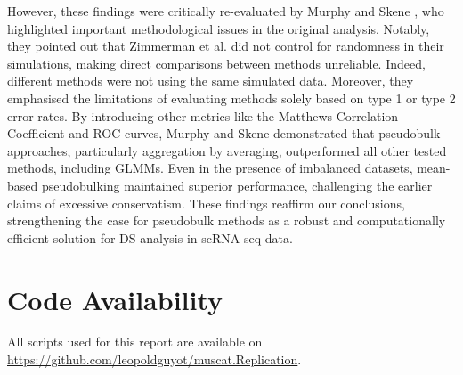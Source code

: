 \documentclass[a4paper, 11pt, twocolumn]{article}
\begin{document}
\begin{multicols}{2}
However, these findings were critically re-evaluated by Murphy and Skene \citep{murphy2022balanced}, who highlighted important methodological issues in the original analysis. Notably, they pointed out that Zimmerman et al. did not control for randomness in their simulations, making direct comparisons between methods unreliable. Indeed, different methods were not using the same simulated data. Moreover, they emphasised the limitations of evaluating methods solely based on type 1 or type 2 error rates. By introducing other metrics like the Matthews Correlation Coefficient and ROC curves, Murphy and Skene demonstrated that pseudobulk approaches, particularly aggregation by averaging, outperformed all other tested methods, including GLMMs. Even in the presence of imbalanced datasets, mean-based pseudobulking maintained superior performance, challenging the earlier claims of excessive conservatism. These findings reaffirm our conclusions, strengthening the case for pseudobulk methods as a robust and computationally efficient solution for DS analysis in scRNA-seq data.

\section*{Code Availability}

All scripts used for this report are available on \url{https://github.com/leopoldguyot/muscat.Replication}.

\end{multicols}
\end{document}
